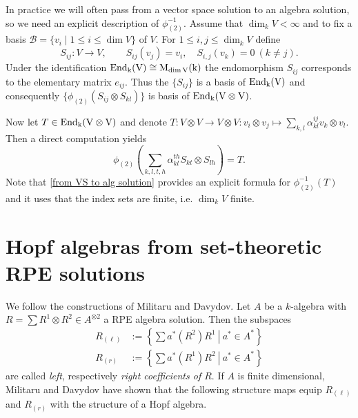 \documentclass[a4paper,10pt]{amsart}
\theoremstyle{definition}
\theoremstyle{remark}
\newcommand{\Ma}{\operatorname{M}}
\newcommand\End{\rm End}
\newcommand\ot{\otimes}
\begin{document}
In practice we will often pass from a vector space solution to an algebra solution, so we need an explicit description of $\phi_{(2)}^{-1}$. Assume that $\dim_kV< \infty$ and to fix a basis $\mathcal{B} = \{ v_i \mid 1 \leq  i\leq \dim V  \}$ of $V$. For $1\leq i,j\leq \dim_kV$ define
$$S_{ij} : V \longrightarrow V, \qquad S_{ij}(v_j)= v_i,\quad S_{i,j}(v_k)=0 \ (k\neq j).$$
Under the identification $\End_k(V) \cong \Ma_{\dim V}(k)$ the endomorphism $S_{ij}$ corresponds to the elementary matrix $e_{ij}$. Thus the $\{S_{ij}\}$ is a basis  of $\End_k(V)$ and consequently $\{ \phi_{(2)}(S_{ij}\ot S_{kl}) \}$ is basis of $\End_k(V\ot V)$.

Now let $T \in \End_k(V \ot V)$ and denote $T : V \ot V \rightarrow V \ot V : v_i \ot v_j \mapsto \sum_{k,l} \alpha_{kl}^{ij} v_k \ot v_l$. Then a direct computation yields
\begin{equation}\label{from VS to alg solution}
\phi_{(2)}\left( \sum_{k,l,t,h} \alpha_{kl}^{th} S_{kt} \ot S_{lh} \right) = T.
\end{equation}
Note that \eqref{from VS to alg solution} provides an explicit formula for $\phi_{(2)}^{-1}(T)$ and it uses that the index sets are finite, i.e. $\dim_k V$ finite. 


\section{Hopf algebras from set-theoretic RPE solutions}\label{section background coeff alg}

We follow the constructions of Militaru and Davydov. 
Let $A$ be a $k$-algebra with $R=\sum R^{1}\otimes R^{2} \in A^{\otimes 2}$ a RPE algebra solution. Then the subspaces
\begin{align*}
    R_{(\ell)} & :=\left\{\left.\sum a^{\ast}(R^{2})R^{1}\ \right|\  a^{\ast}\in A^{\ast}\right\} \\
 R_{(r)} &:=\left\{\left.\sum a^{\ast}(R^{1})R^{2}\ \right|\  a^{\ast}\in A^{\ast}\right\}
\end{align*}
are called \emph{left}, respectively \emph{right coefficients of $R$}. If $A$ is finite dimensional, Militaru \cite{Mi04} and Davydov \cite{Dav} have shown that the following structure maps equip $R_{(\ell)}$ and $R_{(r)}$ with the structure of a Hopf algebra.
\end{document}
